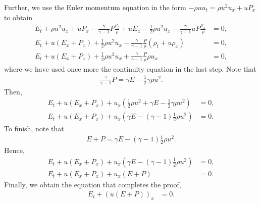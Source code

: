 \begin{questions}
\begin{solution}
Further, we use the Euler momentum equation in the form $-\rho uu_t=\rho u^2u_x+uP_x$ to obtain
\begin{align*}
E_t+\rho u^2 u_x+uP_x-\frac{\gamma}{\gamma-1}P\frac{\rho_t}{\rho}+u E_x-\frac{1}{2}\rho u^2 u_x-\frac{\gamma}{\gamma-1}uP\frac{\rho_x}{\rho}&=0,\\
E_t+u(E_x+P_x)+\frac{1}{2}\rho u^2 u_x-\frac{\gamma}{\gamma-1}\frac{P}{\rho}\left(\rho_t+u\rho_x\right)&=0,\\
E_t+u(E_x+P_x)+\frac{1}{2}\rho u^2 u_x+\frac{\gamma}{\gamma-1}\frac{P}{\rho}\rho u_x&=0,
\end{align*}
where we have used once more the continuity equation in the last step. Note that
\begin{align*}
\frac{\gamma}{\gamma-1}P=\gamma E-\frac{1}{2}\gamma\rho u^2.
\end{align*}
Then,
\begin{align*}
E_t+u(E_x+P_x)+u_x\left(\frac{1}{2}\rho u^2+\gamma E-\frac{1}{2}\gamma\rho u^2\right)&=0,\\
E_t+u(E_x+P_x)+u_x\left(\gamma E-(\gamma-1)\frac{1}{2}\rho u^2\right)&=0.
\end{align*}
To finish, note that 
\begin{align*}
E+P = \gamma E-(\gamma-1)\frac{1}{2}\rho u^2.
\end{align*}
Hence,
\begin{align*}
E_t+u(E_x+P_x)+u_x\left(\gamma E-(\gamma-1)\frac{1}{2}\rho u^2\right)&=0,\\
E_t+u(E_x+P_x)+u_x\left(E+P\right)&=0.
\end{align*}
Finally, we obtain the equation that completes the proof,
\begin{align*}
E_t+\left(u\left(E+P\right)\right)_x&=0.
\end{align*}
\end{solution}
\end{questions}
